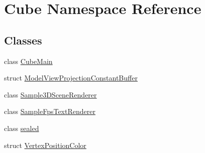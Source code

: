 \hypertarget{namespace_cube}{}\section{Cube Namespace Reference}
\label{namespace_cube}
\subsection*{Classes}
\begin{DoxyCompactItemize}
\item 
class \hyperlink{class_cube_1_1_cube_main}{Cube\+Main}
\item 
struct \hyperlink{struct_cube_1_1_model_view_projection_constant_buffer}{Model\+View\+Projection\+Constant\+Buffer}
\item 
class \hyperlink{class_cube_1_1_sample3_d_scene_renderer}{Sample3\+D\+Scene\+Renderer}
\item 
class \hyperlink{class_cube_1_1_sample_fps_text_renderer}{Sample\+Fps\+Text\+Renderer}
\item 
class \hyperlink{class_cube_1_1sealed}{sealed}
\item 
struct \hyperlink{struct_cube_1_1_vertex_position_color}{Vertex\+Position\+Color}
\end{DoxyCompactItemize}
